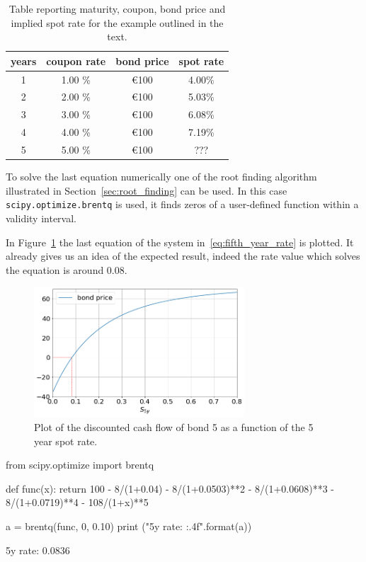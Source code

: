 \begin{table}[htb]
\begin{center}
\begin{tabular}{|c|c|c|c|}
\hline
\textbf{years} & \textbf{coupon rate} & \textbf{bond price} & \textbf{spot rate} \\
\hline
1 & 1.00 \% & \euro{100} & 4.00\% \\
\hline
2 & 2.00 \% & \euro{100} & 5.03\% \\
\hline
3 & 3.00 \% & \euro{100} & 6.08\% \\
\hline
4 & 4.00 \% & \euro{100} & 7.19\% \\
\hline
5 & 5.00 \% & \euro{100} & ??? \\
\hline
\end{tabular}
\end{center}
\caption{Table reporting maturity, coupon, bond price and implied spot rate for the example outlined in the text.}
\label{tab:rates}
\end{table}

To solve the last equation numerically one of the root finding algorithm illustrated in Section~\ref{sec:root_finding} can be used. 
In this case \texttt{scipy.optimize.brentq} is used, it finds zeros of a user-defined function within a validity interval.

In Figure~\ref{fig:fifth_year_rate} the last equation of the system in~\ref{eq:fifth_year_rate} is plotted. It already gives us an idea of the expected result, indeed the rate value which solves the equation is around 0.08.

\begin{figure}[htb]
  \centering
  \includegraphics[width=0.7\textwidth]{figures/bond_5_plot.png}
  \caption{Plot of the discounted cash flow of bond 5 as a function of the 5 year spot rate.}
  \label{fig:fifth_year_rate}
\end{figure}

\begin{ipython}
from scipy.optimize import brentq

def func(x):
    return 100 - 8/(1+0.04) - 8/(1+0.0503)**2 - 8/(1+0.0608)**3
               - 8/(1+0.0719)**4 - 108/(1+x)**5
               
a = brentq(func, 0, 0.10)
print ("5y rate: {:.4f}".format(a))
\end{ipython}
\begin{ioutput}
5y rate: 0.0836
\end{ioutput}

